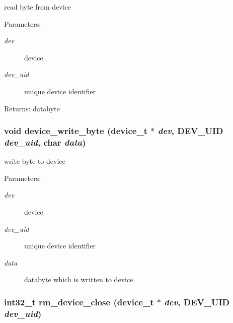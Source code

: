 read byte from device 

\begin{Desc}
\item[Parameters:]
\begin{description}
\item[{\em dev}]device \item[{\em dev\_\-uid}]unique device identifier \end{description}
\end{Desc}
\begin{Desc}
\item[Returns:]databyte \end{Desc}
\hypertarget{group___d_e_v_i_c_e___a_p_i_gdbf6ebde9656a7eee490f554ac3dcbea}{
\subsubsection[{device\_\-write\_\-byte}]{\setlength{\rightskip}{0pt plus 5cm}void device\_\-write\_\-byte (device\_\-t $\ast$ {\em dev}, \/  {\bf DEV\_\-UID} {\em dev\_\-uid}, \/  char {\em data})}}
\label{group___d_e_v_i_c_e___a_p_i_gdbf6ebde9656a7eee490f554ac3dcbea}


write byte to device 

\begin{Desc}
\item[Parameters:]
\begin{description}
\item[{\em dev}]device \item[{\em dev\_\-uid}]unique device identifier \item[{\em data}]databyte which is written to device \end{description}
\end{Desc}
\hypertarget{group___d_e_v_i_c_e___a_p_i_g43618e7de934afd7241ae12191fb15d2}{
\subsubsection[{rm\_\-device\_\-close}]{\setlength{\rightskip}{0pt plus 5cm}int32\_\-t rm\_\-device\_\-close (device\_\-t $\ast$ {\em dev}, \/  {\bf DEV\_\-UID} {\em dev\_\-uid})}}
\label{group___d_e_v_i_c_e___a_p_i_g43618e7de934afd7241ae12191fb15d2}


